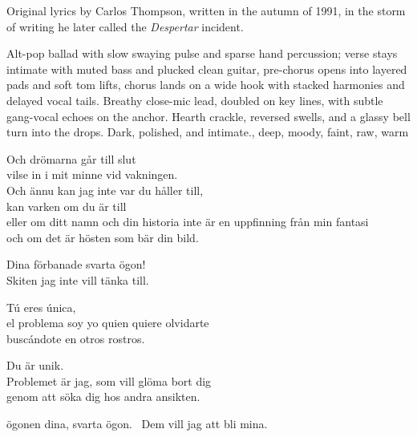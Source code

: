 

\begin{notes}
Original lyrics by Carlos Thompson, written in the autumn of 1991, in the storm of writing he later called the \emph{Despertar} incident.
\end{notes}

\begin{style}
Alt-pop ballad with slow swaying pulse and sparse hand percussion; verse stays intimate with muted bass and plucked clean guitar, pre-chorus opens into layered pads and soft tom lifts, chorus lands on a wide hook with stacked harmonies and delayed vocal tails. %
Breathy close-mic lead, doubled on key lines, with subtle gang-vocal echoes on the anchor. %
Hearth crackle, reversed swells, and a glassy bell turn into the drops. %
Dark, polished, and intimate., deep, moody, faint, raw, warm
\end{style}

\begin{lyrics}
Och drömarna går till slut\\
vilse in i mit minne vid vakningen.\\
Och ännu kan jag inte var du håller till,\\
kan varken om du är till\\
eller om ditt namn och din historia inte är en uppfinning från min fantasi\\
och om det är hösten som bär din bild.

Dina förbanade svarta ögon!\\
Skiten jag inte vill tänka till.

Tú eres única,\\
el problema soy yo quien quiere olvidarte\\
buscándote en otros rostros. 

Du är unik.\\ 
Problemet är jag, som vill glöma bort dig\\
genom att söka dig hos andra ansikten.

ögonen dina, svarta ögon.
~Dem vill jag att bli mina.
\end{lyrics}

